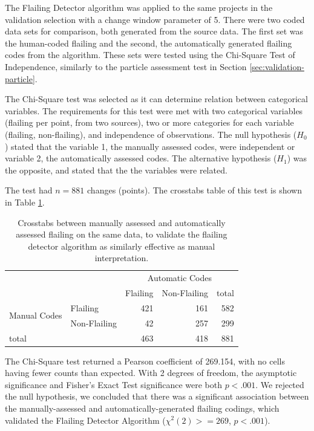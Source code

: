 The Flailing Detector algorithm was applied to the same projects in the validation selection with a change window parameter of 5. There were two coded data sets for comparison, both generated from the source data. The first set was the human-coded flailing and the second, the automatically generated flailing codes from the algorithm. These sets were tested using the Chi-Square Test of Independence, similarly to the particle assessment test in Section \ref{sec:validation-particle}.

The Chi-Square test was selected as it can determine relation between categorical variables. The requirements for this test were met with two categorical variables (flailing per point, from two sources), two or more categories for each variable (flailing, non-flailing), and independence of observations. The null hypothesis ($H_0$) stated that the variable 1, the manually assessed codes, were independent or variable 2, the automatically assessed codes. The alternative hypothesis ($H_1$) was the opposite, and stated that the the variables were related.

The test had $n=881$ changes (points). The crosstabs table of this test is shown in Table \ref{tab:crosstab-flailing-detector}.
\begin{table}
\begin{centering}
	\begin{tabular}{l l r r | r}
			&& \multicolumn{3}{c}{Automatic Codes} 	\\
			&	& Flailing 	& Non-Flailing 	& total	\\ \hline
	\multirow{2}{*}{Manual Codes}
	& Flailing 		& 421	& 161		& 582	\\
	& Non-Flailing	& 42	& 257		& 299	\\ \hline
	total	&  		& 463	& 418		& 881
	\end{tabular}
	\caption[Flailing Crosstabs for Flailing Detector Validation]{Crosstabs between manually assessed and automatically assessed flailing on the same data, to validate the flailing detector algorithm as similarly effective as manual interpretation.}
	\label{tab:crosstab-flailing-detector}
\end{centering}
\end{table}

The Chi-Square test returned a Pearson coefficient of 269.154, with no cells having fewer counts than expected. With 2 degrees of freedom, the asymptotic significance and Fisher's Exact Test significance were both $p<.001$. We rejected the null hypothesis, we concluded that there was a significant association between the manually-assessed and automatically-generated flailing codings, which validated the Flailing Detector Algorithm ($\chi^2(2)>= 269$, $p < .001$). 


